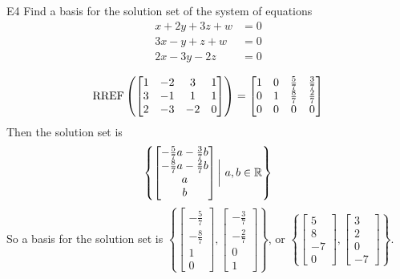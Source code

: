 \documentclass{sbgLAquiz}
\begin{document}
\begin{extract}\newpage\end{extract}
\begin{problem}{E4} 
Find a basis for the solution set of the system of equations
\begin{align*}
x+2y+3z+w &= 0 \\
3x-y+z+w &= 0 \\
2x-3y-2z &= 0 
\end{align*}
\end{problem}
\begin{solution}
$$\operatorname{RREF} \left(\begin{bmatrix} 1 & -2 & 3 & 1 \\ 3 & -1 & 1 & 1 \\ 2 & -3 & -2 & 0  \end{bmatrix} \right) = \begin{bmatrix} 1 & 0 & \frac{5}{7} & \frac{3}{7} \\ 0 & 1 & \frac{8}{7} & \frac{2}{7} \\ 0 & 0 & 0 & 0\end{bmatrix}$$
Then the solution set is
$$\left\{ \begin{bmatrix} -\frac{5}{7}a-\frac{3}{7}b \\ -\frac{8}{7}a-\frac{2}{7}b \\ a \\ b \end{bmatrix} \bigg |\ a,b \in \mathbb{R} \right\}$$
So a basis for the solution set is $\left\{\begin{bmatrix} -\frac{5}{7} \\ -\frac{8}{7} \\ 1 \\ 0\end{bmatrix}, \begin{bmatrix} - \frac{3}{7} \\ -\frac{2}{7} \\ 0 \\ 1 \end{bmatrix} \right\}$, or $\left\{\begin{bmatrix} 5 \\ 8 \\ -7 \\ 0 \end{bmatrix}, \begin{bmatrix} 3 \\ 2 \\ 0 \\ -7 \end{bmatrix}\right\}$.
\end{solution}
\end{document}

